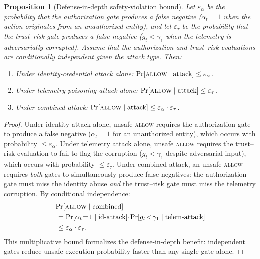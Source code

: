 \documentclass[10pt,journal,compsoc]{IEEEtran}
\newtheorem{proposition}{Proposition}
\begin{document}
\begin{proposition}[Defense-in-depth safety-violation bound]
\label{prop:depth}
Let $\varepsilon_\alpha$ be the probability that the authorization gate produces a false negative ($\alpha_t = 1$ when the action originates from an unauthorized entity), and let $\varepsilon_\tau$ be the probability that the trust--risk gate produces a false negative ($g_t < \gamma_1$ when the telemetry is adversarially corrupted).
Assume that the authorization and trust--risk evaluations are conditionally independent given the attack type.
Then:
\begin{enumerate}
    \item Under identity-credential attack alone: $\Pr[\textsc{allow} \mid \text{attack}] \le \varepsilon_\alpha$.
    \item Under telemetry-poisoning attack alone: $\Pr[\textsc{allow} \mid \text{attack}] \le \varepsilon_\tau$.
    \item Under combined attack: $\Pr[\textsc{allow} \mid \text{attack}] \le \varepsilon_\alpha \cdot \varepsilon_\tau$.
\end{enumerate}
\end{proposition}
\begin{proof}
Under identity attack alone, unsafe \textsc{allow} requires the authorization gate to produce a false negative ($\alpha_t = 1$ for an unauthorized entity), which occurs with probability $\le \varepsilon_\alpha$.
Under telemetry attack alone, unsafe \textsc{allow} requires the trust--risk evaluation to fail to flag the corruption ($g_t < \gamma_1$ despite adversarial input), which occurs with probability $\le \varepsilon_\tau$.
Under combined attack, an unsafe \textsc{allow} requires \emph{both} gates to simultaneously produce false negatives: the authorization gate must miss the identity abuse \emph{and} the trust--risk gate must miss the telemetry corruption.
By conditional independence:
\begin{align*}
&\Pr[\textsc{allow} \mid \text{combined}]\\
&\;= \Pr[\alpha_t\!=\!1 \mid \text{id-attack}] \!\cdot\! \Pr[g_t\!<\!\gamma_1 \mid \text{telem-attack}]\\
&\;\le \varepsilon_\alpha \cdot \varepsilon_\tau.
\end{align*}
This multiplicative bound formalizes the defense-in-depth benefit: independent gates reduce unsafe execution probability faster than any single gate alone.
\end{proof}
\end{document}
